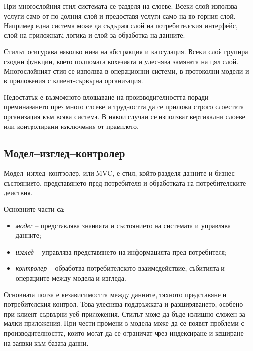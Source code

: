 \begin{defn}
При многослойния стил системата се разделя на слоеве. Всеки слой използва услуги само от по-долния слой и предоставя услуги само на по-горния слой. Например една система може да съдържа слой на потребителския интерфейс, слой на приложната логика и слой за обработка на данните.
\end{defn}

Стилът осигурява няколко нива на абстракция и капсулация. Всеки слой групира сходни функции, което подпомага кохезията и улеснява замяната на цял слой. Многослойният стил се използва в операционни системи, в протоколни модели и в приложения с клиент-сървърна организация.

Недостатък е възможното влошаване на производителността поради преминаването през много слоеве и трудността да се приложи строго слоестата организация към всяка система. В някои случаи се използват вертикални слоеве или контролирани изключения от правилото.

\subsection{Модел--изглед--контролер}\label{s:27.4.2}

\begin{defn}
Модел--изглед--контролер, или MVC, е стил, който разделя данните и бизнес състоянието, представянето пред потребителя и обработката на потребителските действия.
\end{defn}

Основните части са:

\begin{itemize}
    \item \emph{модел} -- представлява знанията и състоянието на системата и управлява данните;
    \item \emph{изглед} -- управлява представянето на информацията пред потребителя;
    \item \emph{контролер} -- обработва потребителското взаимодействие, събитията и операциите между модела и изгледа.
\end{itemize}

Основната полза е независимостта между данните, тяхното представяне и потребителския контрол. Това улеснява поддръжката и разширяването, особено при клиент-сървърни уеб приложения. Стилът може да бъде излишно сложен за малки приложения. При чести промени в модела може да се появят проблеми с производителността, които могат да се ограничат чрез индексиране и кеширане на заявки към базата данни.

